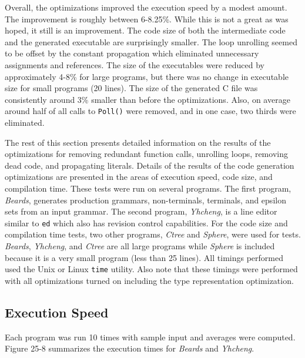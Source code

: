 Overall, the optimizations improved the execution speed by a modest
amount. The improvement is roughly between 6-8.25\%.  While this is
not a great as was hoped, it still is an improvement. The code size of
both the intermediate code and the generated executable are
surprisingly smaller. The loop unrolling seemed to be offset by the
constant propagation which eliminated unnecessary assignments and
references. The size of the executables were reduced by approximately
4-8\% for large programs, but there was no change in executable size
for small programs (20 lines). The size of the generated C file was
consistently around 3\% smaller than before the optimizations.
Also, on average around half of all calls to \texttt{Poll()} were
removed, and in one case, two thirds were eliminated.

The rest of this section presents detailed information on the results of the
optimizations for removing redundant function calls, unrolling loops,
removing dead code, and propagating literals.  Details of the results
of the code generation optimizations are presented in the areas of
execution speed, code size, and compilation time. These tests were run
on several programs. The first program, \textit{Beards}, generates
production grammars, non-terminals, terminals, and epsilon sets from
an input grammar. The second program, \textit{Yhcheng}, is a line
editor similar to \texttt{ed} which also has revision control
capabilities. For the code size and compilation time tests, two other
programs, \textit{Ctree} and \textit{Sphere}, were used for
tests. \textit{Beards}, \textit{Yhcheng}, and \textit{Ctree} are all
large programs while \textit{Sphere} is included because it is a very
small program (less than 25 lines).  All timings performed used the
Unix or Linux \texttt{time} utility.  Also note that these timings
were performed with all optimizations turned on including the type
representation optimization.

\subsection{Execution Speed}

Each program was run 10 times with sample input and averages were
computed. Figure 25-8 summarizes the execution times for
\textit{Beards} and \textit{Yhcheng}.

